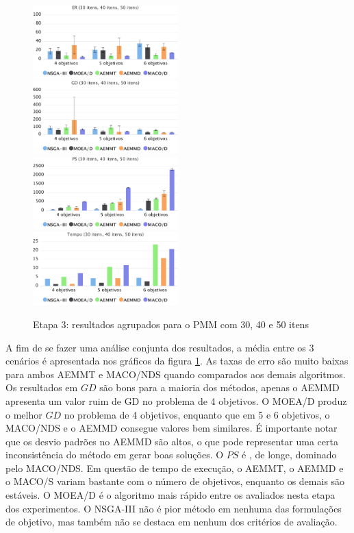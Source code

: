 \begin{figure}[!htbp]
	\caption{Etapa 3: resultados agrupados para o PMM com 30, 40 e 50 itens}
	\label{fig_exp3_pmm_todos}
	\includegraphics[width=0.5\textwidth]{cap_experimentos/figs/etapa3/er-mkp-todos}
	\includegraphics[width=0.5\textwidth]{cap_experimentos/figs/etapa3/gd-mkp-todos}
	\includegraphics[width=0.5\textwidth]{cap_experimentos/figs/etapa3/ps-mkp-todos}
	\includegraphics[width=0.5\textwidth]{cap_experimentos/figs/etapa3/time-mkp-todos}
\end{figure}

A fim de se fazer uma análise conjunta dos resultados, a média entre os 3 cenários é apresentada nos gráficos da figura \ref{fig_exp3_pmm_todos}. As taxas de erro são muito baixas para ambos AEMMT e MACO/NDS quando comparados aos demais algoritmos. Os resultados em $GD$ são bons para a maioria dos métodos, apenas o AEMMD apresenta um valor ruim de GD no problema de 4 objetivos. O MOEA/D produz o melhor $GD$ no problema de 4 objetivos, enquanto que em 5 e 6 objetivos, o MACO/NDS e o AEMMD consegue valores bem similares. É importante notar que os desvio padrões no AEMMD são altos, o que pode representar uma certa inconsistência do método em gerar boas soluções. O $PS$ é , de longe, dominado pelo MACO/NDS. Em questão de tempo de execução, o AEMMT, o AEMMD e o MACO/S variam bastante com o número de objetivos, enquanto os demais são estáveis. O MOEA/D é o algoritmo mais rápido entre os avaliados nesta etapa dos experimentos. O NSGA-III não é pior método em nenhuma das formulações de objetivo, mas também não se destaca em nenhum dos critérios de avaliação.

